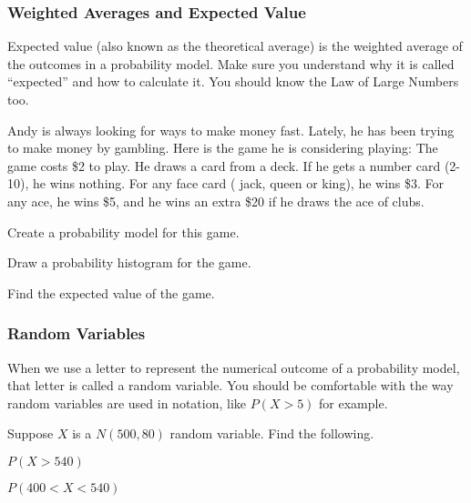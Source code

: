 \documentclass[12pt]{exam}
\newcounter{countA}
\begin{document}
\subsubsection*{Weighted Averages and Expected
Value}\label{weighted-averages-and-expected-value}

Expected value (also known as the theoretical average) is the weighted
average of the outcomes in a probability model. Make sure you understand
why it is called ``expected'' and how to calculate it. You should know
the Law of Large Numbers too.

\begin{questions}
\setcounter{question}{\value{countA}}

\item
  Andy is always looking for ways to make money fast. Lately, he has
  been trying to make money by gambling. Here is the game he is
  considering playing: The game costs \$2 to play. He draws a card from
  a deck. If he gets a number card (2-10), he wins nothing. For any face
  card ( jack, queen or king), he wins \$3. For any ace, he wins \$5,
  and he wins an extra \$20 if he draws the ace of clubs.

  \begin{parts}
  \item
    Create a probability model for this game.
\vfill
  \item
    Draw a probability histogram for the game.
\vfill
  \item
    Find the expected value of the game.
\vfill
  \end{parts}

\setcounter{countA}{\value{question}}
\end{questions}

\subsubsection*{Random Variables}\label{random-variables}

When we use a letter to represent the numerical outcome of a probability
model, that letter is called a random variable. You should be
comfortable with the way random variables are used in notation, like
\(P(X > 5)\) for example.

\begin{questions}
\setcounter{question}{\value{countA}}

\item
  Suppose \(X\) is a \(N(500,80)\) random variable. Find the following.

  \begin{parts}
  \item
    \(P(X > 540)\)
\vfill
  \item
    \(P(400 < X < 540)\)
\vfill
  \end{parts}

\setcounter{countA}{\value{question}}
\end{questions}
\end{document}
